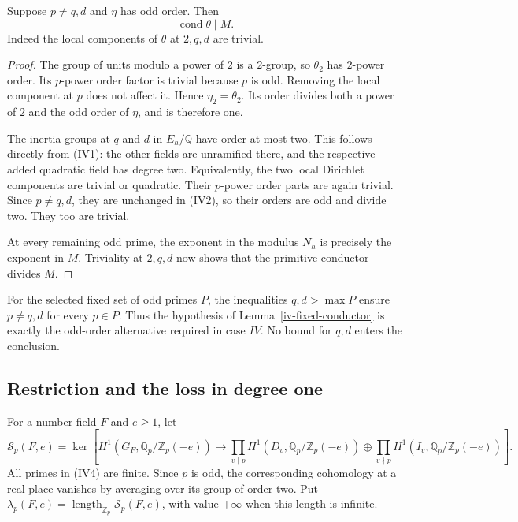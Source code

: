 \begin{lemma}\label{iv-fixed-conductor}
Suppose $p\ne q,d$ and $\eta$ has odd order. Then
\[
                              \operatorname{cond}\theta\mid M.
                                                               \tag{IV3}
\]
Indeed the local components of $\theta$ at $2,q,d$ are trivial.
\end{lemma}
\begin{proof}
The group of units modulo a power of $2$ is a $2$-group, so
$\theta_2$ has $2$-power order. Its $p$-power order factor is
trivial because $p$ is odd. Removing the local component at $p$
does not affect it. Hence $\eta_2=\theta_2$. Its order divides
both a power of $2$ and the odd order of $\eta$, and is therefore
one.

The inertia groups at $q$ and $d$ in $E_h/\mathbb Q$ have order
at most two. This follows directly from (IV1): the other fields
are unramified there, and the respective added quadratic field
has degree two. Equivalently, the two local Dirichlet components
are trivial or quadratic. Their $p$-power order parts are again
trivial. Since $p\ne q,d$, they are unchanged in (IV2), so their
orders are odd and divide two. They too are trivial.

At every remaining odd prime, the exponent in the modulus $N_h$
is precisely the exponent in $M$. Triviality at $2,q,d$ now
shows that the primitive conductor divides $M$.
\end{proof}

For the selected fixed set of odd primes $P$, the inequalities
$q,d>\max P$ ensure $p\ne q,d$ for every $p\in P$.
Thus the hypothesis of Lemma~\ref{iv-fixed-conductor} is exactly
the odd-order alternative required in case $IV$. No bound for
$q,d$ enters the conclusion.

\subsection{Restriction and the loss in degree one}

For a number field $F$ and $e\ge1$, let
\[
 \mathcal S_p(F,e)=\ker\left[
 H^1(G_F,\mathbb Q_p/\mathbb Z_p(-e))\longrightarrow
 \prod_{v\mid p}H^1(D_v,\mathbb Q_p/\mathbb Z_p(-e))
 \oplus\prod_{v\nmid p}H^1(I_v,\mathbb Q_p/\mathbb Z_p(-e))
 \right].                                                     \tag{IV4}
\]
All primes in (IV4) are finite. Since $p$ is odd, the corresponding
cohomology at a real place vanishes by averaging over its group
of order two. Put
$\lambda_p(F,e)=\operatorname{length}_{\mathbb Z_p}\mathcal S_p(F,e)$,
with value $+\infty$ when this length is infinite.

